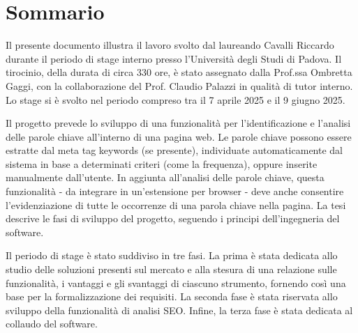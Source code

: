 \cleardoublepage
{}
{}
\begingroup
\let\clearpage\relax
\let\cleardoublepage\relax
\let\cleardoublepage\relax

\chapter*{Sommario}

\par Il presente documento illustra il lavoro svolto dal laureando Cavalli Riccardo durante il periodo di stage interno presso l’Università degli Studi di Padova. Il tirocinio, della durata di circa 330 ore, è stato assegnato dalla Prof.ssa Ombretta Gaggi, con la collaborazione del Prof. Claudio Palazzi in qualità di tutor interno. Lo stage si è svolto nel periodo compreso tra il 7 aprile 2025 e il 9 giugno 2025.

\vspace{10pt}
\par\noindent Il progetto prevede lo sviluppo di una funzionalità per l’identificazione e l’analisi delle parole chiave all’interno di una pagina web. Le parole chiave possono essere estratte dal meta tag keywords (se presente), individuate automaticamente dal sistema in base a determinati criteri (come la frequenza), oppure inserite manualmente dall’utente. In aggiunta all’analisi delle parole chiave, questa funzionalità - da integrare in un’estensione per browser - deve anche consentire l’evidenziazione di tutte le occorrenze di una parola chiave nella pagina. La tesi descrive le fasi di sviluppo del progetto, seguendo i principi dell’ingegneria del software.

\vspace{10pt}
\par\noindent Il periodo di stage è stato suddiviso in tre fasi. La prima è stata dedicata allo studio delle soluzioni presenti sul mercato e alla stesura di una relazione sulle funzionalità, i vantaggi e gli svantaggi di ciascuno strumento, fornendo così una base per la formalizzazione dei requisiti. La seconda fase è stata riservata allo sviluppo della funzionalità di analisi SEO. Infine, la terza fase è stata dedicata al collaudo del software.




\endgroup

\vfill
